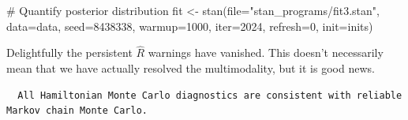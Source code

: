 \documentclass[
  letterpaper,
  DIV=11,
  numbers=noendperiod]{scrartcl}
\newenvironment{Shaded}{\begin{snugshade}}{\end{snugshade}}
\newcommand{\AttributeTok}[1]{\textcolor[rgb]{0.40,0.45,0.13}{#1}}
\newcommand{\CommentTok}[1]{\textcolor[rgb]{0.37,0.37,0.37}{#1}}
\newcommand{\ConstantTok}[1]{\textcolor[rgb]{0.56,0.35,0.01}{#1}}
\newcommand{\DecValTok}[1]{\textcolor[rgb]{0.68,0.00,0.00}{#1}}
\newcommand{\FunctionTok}[1]{\textcolor[rgb]{0.28,0.35,0.67}{#1}}
\newcommand{\NormalTok}[1]{\textcolor[rgb]{0.00,0.23,0.31}{#1}}
\newcommand{\OtherTok}[1]{\textcolor[rgb]{0.00,0.23,0.31}{#1}}
\newcommand{\SpecialCharTok}[1]{\textcolor[rgb]{0.37,0.37,0.37}{#1}}
\newcommand{\StringTok}[1]{\textcolor[rgb]{0.13,0.47,0.30}{#1}}
\begin{document}
\begin{Shaded}
\begin{Highlighting}[]
\CommentTok{\# Quantify posterior distribution}
\NormalTok{fit }\OtherTok{\textless{}{-}} \FunctionTok{stan}\NormalTok{(}\AttributeTok{file=}\StringTok{"stan\_programs/fit3.stan"}\NormalTok{,}
            \AttributeTok{data=}\NormalTok{data, }\AttributeTok{seed=}\DecValTok{8438338}\NormalTok{,}
            \AttributeTok{warmup=}\DecValTok{1000}\NormalTok{, }\AttributeTok{iter=}\DecValTok{2024}\NormalTok{, }\AttributeTok{refresh=}\DecValTok{0}\NormalTok{,}
            \AttributeTok{init=}\NormalTok{inits)}
\end{Highlighting}
\end{Shaded}

Delightfully the persistent \(\hat{R}\) warnings have vanished. This
doesn't necessarily mean that we have actually resolved the
multimodality, but it is good news.

\begin{Shaded}
\end{Shaded}

\begin{verbatim}
  All Hamiltonian Monte Carlo diagnostics are consistent with reliable
Markov chain Monte Carlo.
\end{verbatim}

\begin{Shaded}
\end{Shaded}
\end{document}
